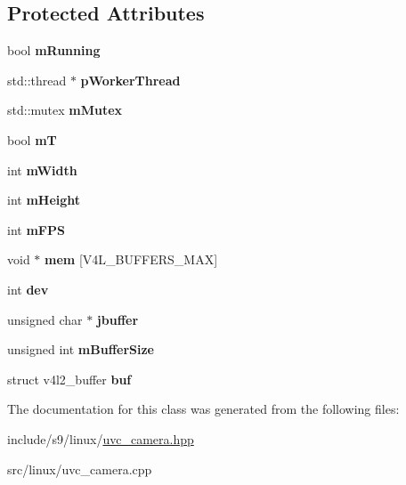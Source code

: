\subsection*{\-Protected \-Attributes}
\begin{DoxyCompactItemize}
\item 
\hypertarget{classUVCVideo_ad524ce09da0c9535532e434dd2fc50c0}{bool {\bfseries m\-Running}}\label{classUVCVideo_ad524ce09da0c9535532e434dd2fc50c0}

\item 
\hypertarget{classUVCVideo_a93dc13b7b27761573d532cc029f4bd64}{std\-::thread $\ast$ {\bfseries p\-Worker\-Thread}}\label{classUVCVideo_a93dc13b7b27761573d532cc029f4bd64}

\item 
\hypertarget{classUVCVideo_afc64962ab969a9133fb8a5dbfdc79bdf}{std\-::mutex {\bfseries m\-Mutex}}\label{classUVCVideo_afc64962ab969a9133fb8a5dbfdc79bdf}

\item 
\hypertarget{classUVCVideo_a853fe33ca98c6c59a74d6cf4dc72a08a}{bool {\bfseries m\-T}}\label{classUVCVideo_a853fe33ca98c6c59a74d6cf4dc72a08a}

\item 
\hypertarget{classUVCVideo_a098edf84331b4c9dd247baf6749d1aff}{int {\bfseries m\-Width}}\label{classUVCVideo_a098edf84331b4c9dd247baf6749d1aff}

\item 
\hypertarget{classUVCVideo_ac3187fdb8d3322017a522858024017f4}{int {\bfseries m\-Height}}\label{classUVCVideo_ac3187fdb8d3322017a522858024017f4}

\item 
\hypertarget{classUVCVideo_a579fe74a5b15f275c4606a3c6e113162}{int {\bfseries m\-F\-P\-S}}\label{classUVCVideo_a579fe74a5b15f275c4606a3c6e113162}

\item 
\hypertarget{classUVCVideo_a6e84e9ee7772d92ec8e3e0150a388479}{void $\ast$ {\bfseries mem} \mbox{[}\-V4\-L\-\_\-\-B\-U\-F\-F\-E\-R\-S\-\_\-\-M\-A\-X\mbox{]}}\label{classUVCVideo_a6e84e9ee7772d92ec8e3e0150a388479}

\item 
\hypertarget{classUVCVideo_ad544fe02b22856ef4399d6859d7bce71}{int {\bfseries dev}}\label{classUVCVideo_ad544fe02b22856ef4399d6859d7bce71}

\item 
\hypertarget{classUVCVideo_a22f39add74dc8e050d2948ff4ab7b739}{unsigned char $\ast$ {\bfseries jbuffer}}\label{classUVCVideo_a22f39add74dc8e050d2948ff4ab7b739}

\item 
\hypertarget{classUVCVideo_a8cf2021f56cfb281e19de3be1b89811f}{unsigned int {\bfseries m\-Buffer\-Size}}\label{classUVCVideo_a8cf2021f56cfb281e19de3be1b89811f}

\item 
\hypertarget{classUVCVideo_a2f457a139e815b1c49c51c0b92e6edca}{struct v4l2\-\_\-buffer {\bfseries buf}}\label{classUVCVideo_a2f457a139e815b1c49c51c0b92e6edca}

\end{DoxyCompactItemize}


\-The documentation for this class was generated from the following files\-:\begin{DoxyCompactItemize}
\item 
include/s9/linux/\hyperlink{uvc__camera_8hpp}{uvc\-\_\-camera.\-hpp}\item 
src/linux/uvc\-\_\-camera.\-cpp\end{DoxyCompactItemize}
